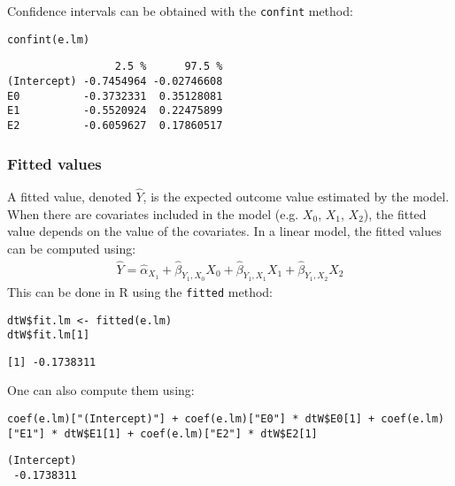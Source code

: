\documentclass{article}
\begin{document}
Confidence intervals can be obtained with the \texttt{confint} method:
\lstset{language=r,label= ,caption= ,captionpos=b,numbers=none}
\begin{lstlisting}
confint(e.lm)
\end{lstlisting}

\begin{verbatim}
                 2.5 %      97.5 %
(Intercept) -0.7454964 -0.02746608
E0          -0.3732331  0.35128081
E1          -0.5520924  0.22475899
E2          -0.6059627  0.17860517
\end{verbatim}

\subsubsection{Fitted values}
\label{sec:org80fb794}

A fitted value, denoted \(\hat{Y}\), is the expected outcome value
estimated by the model. When there are covariates included in the
model (e.g. \(X_{0}\), \(X_{1}\), \(X_{2}\)), the fitted value depends
on the value of the covariates. In a linear model, the fitted values
can be computed using:
\begin{align*}
\hat{Y} = \hat{\alpha}_{X_{1}} + \hat{\beta}_{Y_1,X_0} X_{0} + \hat{\beta}_{Y_1,X_1} X_{1} + \hat{\beta}_{Y_1,X_2} X_{2}
\end{align*}
This can be done in R using the \texttt{fitted} method:
\lstset{language=r,label= ,caption= ,captionpos=b,numbers=none}
\begin{lstlisting}
dtW$fit.lm <- fitted(e.lm)
dtW$fit.lm[1]
\end{lstlisting}

\begin{verbatim}
[1] -0.1738311
\end{verbatim}

One can also compute them using:
\lstset{language=r,label= ,caption= ,captionpos=b,numbers=none}
\begin{lstlisting}
coef(e.lm)["(Intercept)"] + coef(e.lm)["E0"] * dtW$E0[1] + coef(e.lm)["E1"] * dtW$E1[1] + coef(e.lm)["E2"] * dtW$E2[1]
\end{lstlisting}

\begin{verbatim}
(Intercept) 
 -0.1738311
\end{verbatim}
\end{document}
